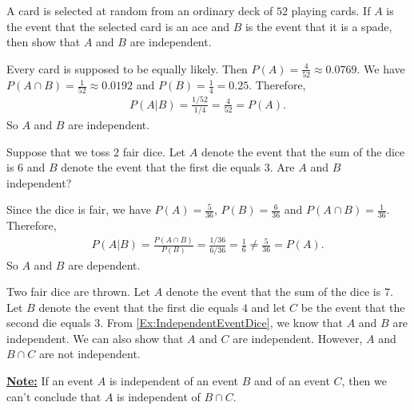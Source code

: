 \vspace*{16pt}

\begin{example}
A card is selected at random from an ordinary deck of $52$ playing cards. If $A$ is the event that the selected card is an ace and $B$ is the event that it is a spade, then show that $A$ and $B$ are independent.
\end{example}

\begin{sol}
Every card is supposed to be equally likely. Then $P (A) = \frac{4}{52} \approx 0.0769$. We have $P (A \cap B) = \frac{1}{52} \approx 0.0192$ and $P (B) = \frac{1}{4} = 0.25$. Therefore,
	\begin{align*}
	P (A | B) = \frac{1/52}{1/4} = \frac{4}{52} = P (A).
	\end{align*}
So $A$ and $B$ are independent.
\end{sol}

\begin{example}\label{Ex:IndependentEventDice}
Suppose that we toss $2$ fair dice. Let $A$ denote the event that the sum of the dice is $6$ and $B$ denote the event that the first die equals $3$. Are $A$ and $B$ independent?
\end{example}

\begin{sol}
Since the dice is fair, we have $P (A) = \frac{5}{36}$, $P (B) = \frac{6}{36}$ and $P (A \cap B) = \frac{1}{36}$. Therefore,
	\begin{align*}
	P (A | B) = \frac{P (A \cap B)}{P (B)} = \frac{1/36}{6/36} = \frac{1}{6} \neq \frac{5}{36} = P (A) .
	\end{align*}
So $A$ and $B$ are dependent.
\end{sol}

\vspace*{16pt}

\begin{example}
Two fair dice are thrown. Let $A$ denote the event that the sum of the dice is $7$. Let $B$ denote the event that the first die equals $4$ and let $C$ be the event that the second die equals $3$. From \cref{Ex:IndependentEventDice}, we know that $A$ and $B$ are independent. We can also show that $A$ and $C$ are independent. However, $A$ and $B \cap C$ are not independent.  
\end{example}

\underline{\textbf{Note:}} If an event $A$ is independent of an event $B$ and of an event $C$, then we can't conclude that $A$ is independent of $B \cap C$.

